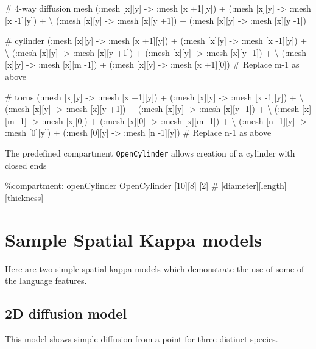 \documentclass[english]{report}
\begin{document}
\begin{kappasource}

# 4-way diffusion mesh
    (:mesh [x][y] -> :mesh [x +1][y]) + (:mesh [x][y] -> :mesh [x -1][y]) + {\textbackslash}
    (:mesh [x][y] -> :mesh [x][y +1]) + (:mesh [x][y] -> :mesh [x][y -1])

# cylinder
    (:mesh [x][y] -> :mesh [x +1][y]) + (:mesh [x][y] -> :mesh [x -1][y]) + {\textbackslash}
    (:mesh [x][y] -> :mesh [x][y +1]) + (:mesh [x][y] -> :mesh [x][y -1]) + {\textbackslash}
    (:mesh [x][y] -> :mesh [x][m -1]) + (:mesh [x][y] -> :mesh [x +1][0]) 
# Replace m-1 as above 

# torus
    (:mesh [x][y] -> :mesh [x +1][y]) + (:mesh [x][y] -> :mesh [x -1][y]) + {\textbackslash}
    (:mesh [x][y] -> :mesh [x][y +1]) + (:mesh [x][y] -> :mesh [x][y -1]) + {\textbackslash}
    (:mesh [x][m -1] -> :mesh [x][0]) + (:mesh [x][0] -> :mesh [x][m -1]) + {\textbackslash}
    (:mesh [n -1][y] -> :mesh [0][y]) + (:mesh [0][y] -> :mesh [n -1][y])
# Replace n-1 as above 
\end{kappasource}

The predefined compartment \verb|OpenCylinder| allows creation of a cylinder with closed ends

\begin{kappasource}
\%compartment: openCylinder  OpenCylinder  [10][8] [2]    # [diameter][length] [thickness]
\end{kappasource}

\newpage
\section{Sample Spatial Kappa models}

Here are two simple spatial kappa models which demonstrate the use of some of the language features.



\subsection{2D  diffusion model}
\label{sec:2dDiffusion}

This model shows simple diffusion from a point for three distinct species.
\end{document}
